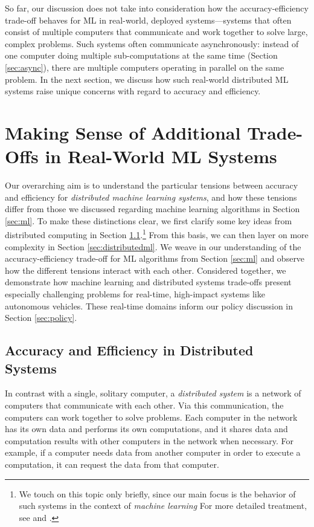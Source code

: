 \documentclass[sigplan,screen]{acmart}
\begin{document}
\noindent So far, our discussion does not take into consideration how the accuracy-efficiency trade-off behaves for ML in real-world, deployed systems---systems that often consist of multiple computers that communicate and work together to solve large, complex problems. Such systems often communicate asynchronously: instead of one computer doing multiple sub-computations at the same time (Section \ref{sec:async}), there are multiple computers operating in parallel on the same problem. In the next section, we discuss how such real-world distributed ML systems raise unique concerns with regard to accuracy and efficiency.

\section{Making Sense of Additional Trade-Offs in Real-World ML Systems} \label{sec:sysml}
Our overarching aim is to understand the particular tensions between accuracy and efficiency for \emph{distributed machine learning systems}, and how these tensions differ from those we discussed regarding machine learning algorithms in Section \ref{sec:ml}. To make these distinctions clear, we first clarify some key ideas from distributed computing in Section \ref{sec:distributedsystems}.\footnote{We touch on this topic only briefly, since our main focus is the behavior of such systems in the context of \emph{machine learning} For more detailed treatment, see \citet{cooper2019isp} and \citet{cooper2020law}.} From this basis, we can then layer on more complexity in Section \ref{sec:distributedml}. We weave in our understanding of the accuracy-efficiency trade-off for ML algorithms from Section \ref{sec:ml} and observe how the different tensions interact with each other. Considered together, we demonstrate how machine learning and distributed systems trade-offs present especially challenging problems for real-time, high-impact systems like autonomous vehicles. These real-time domains inform our policy discussion in Section \ref{sec:policy}.

\subsection{Accuracy and Efficiency in Distributed Systems} \label{sec:distributedsystems}
In contrast with a single, solitary computer, a \emph{distributed system} is a network of computers that communicate with each other. Via this communication, the computers can work together to solve problems. Each computer in the network has its own data and performs its own computations, and it shares data and computation results with other computers in the network when necessary. For example, if a computer needs data from another computer in order to execute a computation, it can request the data from that computer.
\end{document}
